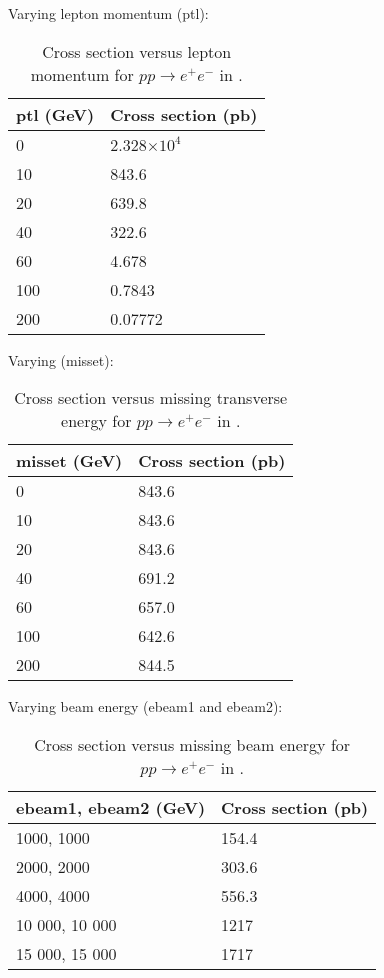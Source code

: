 Varying lepton momentum (ptl):

\begin{table}[H]
\centering
    \begin{tabular}{l|l}
    ptl (GeV) & Cross section (pb) \\ \hline
    0         & 2.328$\times10^4$            \\
    10        & 843.6              \\
    20        & 639.8              \\
    40        & 322.6              \\
    60        & 4.678              \\
    100       & 0.7843             \\
    200       & 0.07772            \\
    \end{tabular}
   \caption{Cross section versus lepton momentum for $pp \rightarrow e^+ e^-$ in \madgraph.}
\end{table}

Varying \etmiss (misset):

\begin{table}[H]
\centering
    \begin{tabular}{l|l}
    misset (GeV) & Cross section (pb) \\ \hline
    0            & 843.6              \\
    10           & 843.6              \\
    20           & 843.6              \\
    40           & 691.2              \\
    60           & 657.0              \\
    100          & 642.6              \\
    200          & 844.5              \\
    \end{tabular}
    \caption{Cross section versus missing transverse energy for $pp \rightarrow e^+ e^-$ in \madgraph.}
\end{table}

Varying beam energy (ebeam1 and ebeam2):

\begin{table}[H]
\centering
    \begin{tabular}{l|l}
    ebeam1, ebeam2 (GeV) & Cross section (pb) \\ \hline
    1000, 1000           & 154.4              \\
    2000, 2000           & 303.6              \\
    4000, 4000           & 556.3              \\
    10 000, 10 000       & 1217               \\
    15 000, 15 000       & 1717               \\
    \end{tabular}
    \caption{Cross section versus missing beam energy for $pp \rightarrow e^+ e^-$ in \madgraph.}
\end{table}

